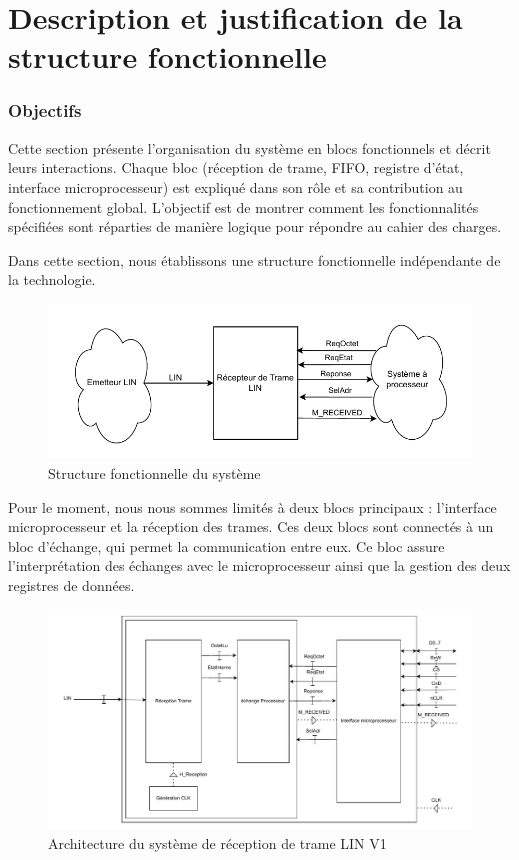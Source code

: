 \section{Description et justification de la structure fonctionnelle}

\subsubsection*{Objectifs}

Cette section présente l’organisation du système en blocs fonctionnels et décrit leurs interactions. Chaque bloc (réception de trame, FIFO, registre d’état, interface microprocesseur) est expliqué dans son rôle et sa contribution au fonctionnement global. L’objectif est de montrer comment les fonctionnalités spécifiées sont réparties de manière logique pour répondre au cahier des charges.
\newline

Dans cette section, nous établissons une structure fonctionnelle indépendante de la technologie.

\begin{figure}[H]
    \centering
    \includegraphics[width=0.8\linewidth]{images/inter/Structure_Fonc_Circuit.pdf}
    \caption{Structure fonctionnelle du système}
    \label{fig:placeholder}
\end{figure}

Pour le moment, nous nous sommes limités à deux blocs principaux : l’interface microprocesseur et la réception des trames. Ces deux blocs sont connectés à un bloc d’échange, qui permet la communication entre eux. Ce bloc assure l’interprétation des échanges avec le microprocesseur ainsi que la gestion des deux registres de données.
\newline

\begin{figure}[H]
    \centering
    \includegraphics[width=0.8\linewidth]{images/inter/Schema_base_circuit.pdf}
    \caption{Architecture du système de réception de trame LIN V1}
    \label{fig:placeholder}
\end{figure}

